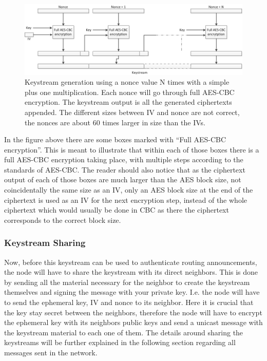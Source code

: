 \begin{figure}[h]
	\centering
  	\includegraphics[width=\textwidth]{images/keystream_generation.png}
  	\caption{Keystream generation using a nonce value N times with a simple plus
  		one multiplication. Each nonce will go through full AES-CBC encryption. The
  		keystream output is all the generated ciphertexts appended. The different
  		sizes between IV and nonce are not correct, the nonces are about 60 times
  		larger in size than the IVs.}
	\label{fig:keystream_generation}
\end{figure}

In the figure above there are some boxes marked with ``Full AES-CBC
encryption''. This is meant to illustrate that within each of those boxes there
is a full AES-CBC encryption taking place, with multiple steps according to the
standards of AES-CBC. The reader should also notice that as the ciphertext
output of each of those boxes are much larger than the AES block size,
not coincidentally the same size as an \ac{IV}, only an AES block size at the
end of the ciphertext is used as an \ac{IV} for the next encryption step,
instead of the whole ciphertext which would usually be done in CBC as there the
ciphertext corresponds to the correct block size.

\subsubsection*{Keystream Sharing}
Now, before this keystream can be used to authenticate routing announcements,
the node will have to share the keystream with its direct neighbors. This is
done by sending all the material necessary for the neighbor to create the
keystream themselves and signing the message with your private key. I.e. the
node will have to send the ephemeral key, \ac{IV} and nonce to its neighbor.
Here it is crucial that the key stay secret between the neighbors, therefore
the node will have to encrypt the ephemeral key with its neighbors public keys
and send a unicast message with the keystream material to each one of them. The
details around sharing the keystreams will be further explained in the
following section regarding all messages sent in the network.

